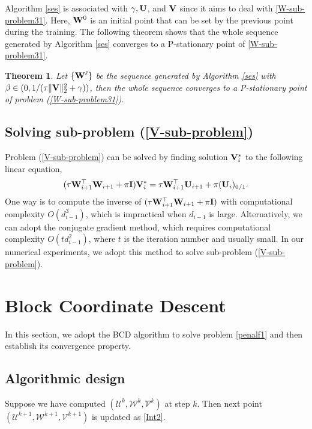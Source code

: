 \documentclass[journal]{IEEEtran}
\newtheorem{theorem}{Theorem}
\newcommand{\be}{\begin{equation}}
\newcommand{\ee}{\end{equation}}
\def\I{{\bf I}}
\def\U{{\bf U}}
\def\V{{\bf V}}
\def\W{{\bf W}}
\def\CU{{\boldsymbol{\mathcal U}}}
\def\CV{{\boldsymbol{\mathcal V}}}
\def\CW{{\boldsymbol{\mathcal W}}}
\begin{document}
Algorithm \ref{ses}  is associated with $\gamma, \U$, and $ \V$  since it aims to deal with \eqref{W-sub-problem31}. Here,  $\W^0$ is an initial point that can be set by the previous point during the training.  The following theorem shows that the whole sequence generated by Algorithm \ref{ses}  converges to a  P-stationary point of  \eqref{W-sub-problem31}.
\begin{theorem} \label{PGM-converge}
Let $\{\W^\ell\}$ be the sequence generated by Algorithm \ref{ses} with $\beta\in(0,1/(\tau \|\V\|_2^2+\gamma))$, then the whole sequence converges to a P-stationary point of problem (\ref{W-sub-problem31}).
\end{theorem}

\subsection{Solving  sub-problem (\ref{V-sub-problem}) }
{Problem (\ref{V-sub-problem}) can be solved by finding  solution $\V_i^*$ to the following linear equation,
\be\label{V-sub-problem-sol}
(\tau\W_{i+1}^\top\W_{i+1}+\pi \I)\V_i^*=\tau\W_{i+1}^\top\U_{i+1} +\pi(\U_{i})_{0/1}.
\ee
One way is to compute the inverse of $(\tau\W_{i+1}^\top\W_{i+1}+\pi \I)$ with computational complexity $O(d_{i-1}^3)$, which is impractical when $d_{i-1}$ is large.  Alternatively, we can adopt the conjugate gradient method, which requires computational complexity $O(td_{i-1}^2)$, where $t$ is the iteration number and usually small. In our numerical experiments, we adopt this method to solve sub-problem (\ref{V-sub-problem}).}
\section{Block Coordinate Descent} \label{Section-algorithm}
In this section, we adopt the BCD  algorithm  to solve problem \eqref{penalf1} and then establish its convergence property.

\subsection{Algorithmic design}

Suppose we have computed $(\CU^{k}, \CW^{k}, \CV^k)$ at step $k$. Then next point   $(\CU^{k+1}, \CW^{k+1},\CV^{k+1})$ is updated as \eqref{Int2}.
\end{document}
